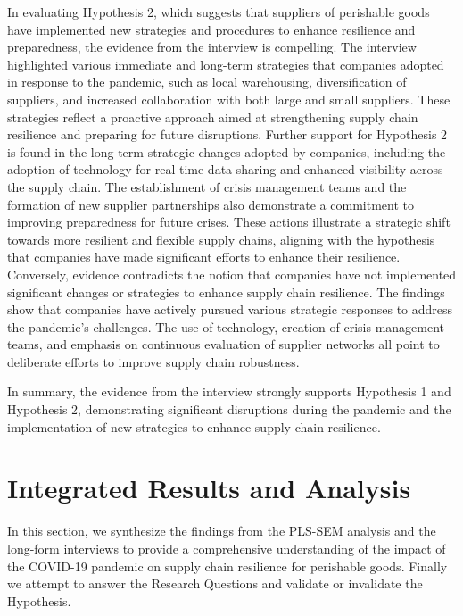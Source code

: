 In evaluating Hypothesis 2, which suggests that suppliers of perishable goods have implemented new strategies and procedures to enhance resilience and preparedness, the evidence from the interview is compelling. The interview highlighted various immediate and long-term strategies that companies adopted in response to the pandemic, such as local warehousing, diversification of suppliers, and increased collaboration with both large and small suppliers. These strategies reflect a proactive approach aimed at strengthening supply chain resilience and preparing for future disruptions. Further support for Hypothesis 2 is found in the long-term strategic changes adopted by companies, including the adoption of technology for real-time data sharing and enhanced visibility across the supply chain. The establishment of crisis management teams and the formation of new supplier partnerships also demonstrate a commitment to improving preparedness for future crises. These actions illustrate a strategic shift towards more resilient and flexible supply chains, aligning with the hypothesis that companies have made significant efforts to enhance their resilience. Conversely, evidence contradicts the notion that companies have not implemented significant changes or strategies to enhance supply chain resilience. The findings show that companies have actively pursued various strategic responses to address the pandemic's challenges. The use of technology, creation of crisis management teams, and emphasis on continuous evaluation of supplier networks all point to deliberate efforts to improve supply chain robustness.

In summary, the evidence from the interview strongly supports Hypothesis 1 and Hypothesis 2, demonstrating significant disruptions during the pandemic and the implementation of new strategies to enhance supply chain resilience.

\section{Integrated Results and Analysis}

In this section, we synthesize the findings from the PLS-SEM analysis and the long-form interviews to provide a comprehensive understanding of the impact of the COVID-19 pandemic on supply chain resilience for perishable goods. Finally we attempt to answer the Research Questions and validate or invalidate the Hypothesis.

